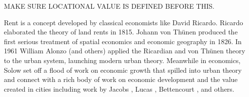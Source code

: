 
MAKE SURE LOCATIONAL VALUE IS DEFINED BEFORE THIS.

Rent is a concept developed by classical economists like David Ricardo. 
Ricardo \cite{ricardoEssayInfluenceLow1815} elaborated the theory of land rents in 1815. Johann von Th\"unen \cite{vonthunenIsolirteStaatBeziehung1826} %
produced the first serious treatment of spatial economics and economic geography %
in 1826. In 1961 William Alonzo (and others) \cite{alonsoModelUrbanLand1960} applied the  Ricardian and von Th\"unen theory to the urban system, launching modern urban theory. Meanwhile in economics, Solow \cite{solowContributionTheoryEconomic1956} set off a flood of work on economic growth that spilled into urban theory and connect with a rich body of work on economic development and the value created in cities including work by Jacobs \cite{jacobsEconomyCities1969}, Lucas \cite{lucasMechanicsEconomicDevelopment1988}, Bettencourt  \cite{bettencourtGrowthInnovationScaling2007}, and others. 

